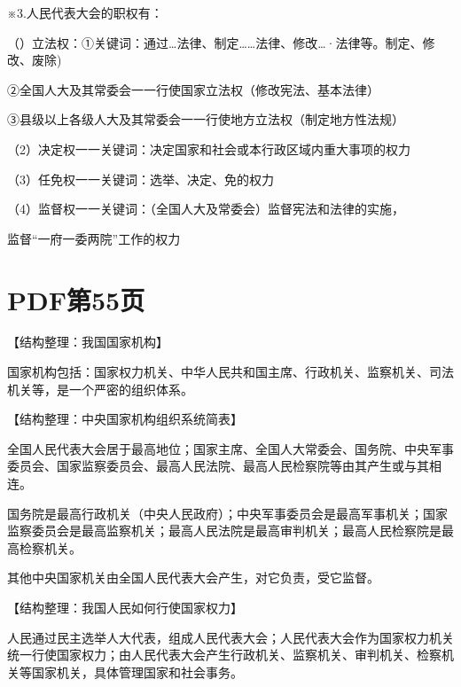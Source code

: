 \documentclass[lang=cn,11pt]{elegantbook}
\newcommand{\daofasym}[1]{{\daofasymbolfont #1}}
\newcommand{\daofasym}[1]{#1}
\begin{document}
※3.人民代表大会的职权有：\par

（）立法权：\daofasym{①}关键词：通过…法律、制定……法律、修改…·法律等。制定、修改、废除)\par

\daofasym{②}全国人大及其常委会一一行使国家立法权（修改宪法、基本法律）\par

\daofasym{③}县级以上各级人大及其常委会一一行使地方立法权（制定地方性法规）\par

（2）决定权一一关键词：决定国家和社会或本行政区域内重大事项的权力\par

（3）任免权一一关键词：选举、决定、免的权力\par

（4）监督权一一关键词：（全国人大及常委会）监督宪法和法律的实施，\par

监督“一府一委两院”工作的权力\par


\section*{PDF第55页}

【结构整理：我国国家机构】\par

国家机构包括：国家权力机关、中华人民共和国主席、行政机关、监察机关、司法机关等，是一个严密的组织体系。\par

【结构整理：中央国家机构组织系统简表】\par

全国人民代表大会居于最高地位；国家主席、全国人大常委会、国务院、中央军事委员会、国家监察委员会、最高人民法院、最高人民检察院等由其产生或与其相连。\par

国务院是最高行政机关（中央人民政府）；中央军事委员会是最高军事机关；国家监察委员会是最高监察机关；最高人民法院是最高审判机关；最高人民检察院是最高检察机关。\par

其他中央国家机关由全国人民代表大会产生，对它负责，受它监督。\par

【结构整理：我国人民如何行使国家权力】\par

人民通过民主选举人大代表，组成人民代表大会；人民代表大会作为国家权力机关统一行使国家权力；由人民代表大会产生行政机关、监察机关、审判机关、检察机关等国家机关，具体管理国家和社会事务。\par
\end{document}
